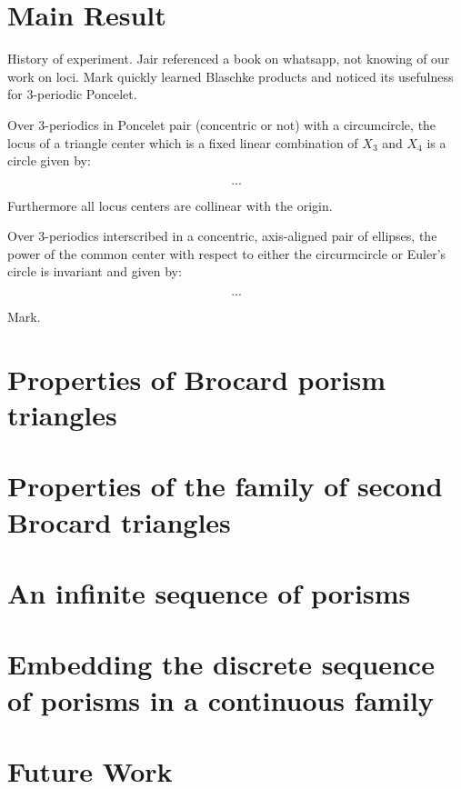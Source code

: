 \section{Main Result}

History of experiment. Jair referenced a book \cite{daepp-2019} on whatsapp, not knowing of our work on loci. Mark quickly learned Blaschke products and noticed its usefulness for 3-periodic Poncelet.

\begin{theorem}
Over 3-periodics in Poncelet pair (concentric or not) with a circumcircle, the locus of a triangle center which is a fixed linear combination of $X_3$ and $X_4$ is a circle given by:
 
\[ ... \]

Furthermore all locus centers are collinear with the origin.
\end{theorem}

\begin{theorem}
Over 3-periodics interscribed in a concentric, axis-aligned pair of ellipses, the power of the common center with respect to either the circurmcircle or Euler's circle is invariant and given by:

\[ ... \]
\end{theorem}


Mark.

\section{Properties of Brocard porism triangles}
\label{sec:review}


\section{Properties of the family of second Brocard triangles}
\label{sec:broc-second}


\section{An infinite sequence of porisms}
\label{sec:porism-seq}


\section{Embedding the discrete sequence of porisms in a continuous family}
\label{sec:continuous}


\section{Future Work}

